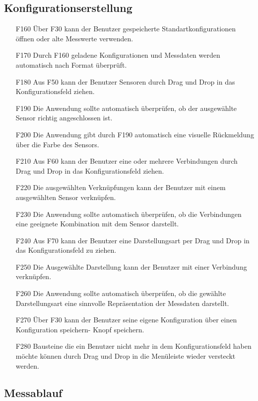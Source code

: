 \documentclass[parskip=full]{scrartcl}
\begin{document}
\subsection{Konfigurationserstellung}

\begin{itemize}

\item[F160] Über F30 kann der Benutzer gespeicherte Standartkonfigurationen öffnen oder alte Messwerte verwenden.
\item[F170] Durch F160 geladene Konfigurationen und Messdaten werden automatisch nach Format überprüft.
\item[F180] Aus F50 kann der Benutzer Sensoren durch Drag und Drop in das Konfigurationsfeld ziehen.
\item[F190] Die Anwendung sollte automatisch überprüfen, ob der ausgewählte Sensor richtig angeschlossen ist.
\item[F200] Die Anwendung gibt durch F190 automatisch eine visuelle Rückmeldung über die Farbe des Sensors.
\item[F210] Aus F60 kann der Benutzer eine oder mehrere Verbindungen durch Drag und Drop in das Konfigurationsfeld ziehen.
\item[F220] Die ausgewählten Verknüpfungen kann der Benutzer mit einem ausgewählten Sensor verknüpfen.
\item[F230] Die Anwendung sollte automatisch überprüfen, ob die Verbindungen eine geeignete Kombination mit dem Sensor darstellt.
\item[F240] Aus F70 kann der Benutzer eine Darstellungsart per Drag und Drop in das Konfigurationsfeld zu ziehen.
\item[F250] Die Ausgewählte Darstellung kann der Benutzer mit einer Verbindung verknüpfen.
\item[F260] Die Anwendung sollte automatisch überprüfen, ob die gewählte Darstellungsart eine sinnvolle Repräsentation der Messdaten darstellt.
\item[F270] Über F30 kann der Benutzer seine eigene Konfiguration über einen Konfiguration speichern- Knopf speichern.
\item[F280] Bausteine die ein Benutzer nicht mehr in dem Konfigurationsfeld haben möchte können durch Drag und Drop in die Menüleiste wieder versteckt werden.

\end{itemize}

\subsection{Messablauf}
\end{document}
